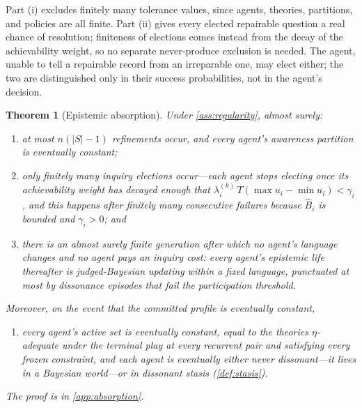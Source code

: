 \documentclass[11pt]{article}
\newtheorem{theorem}[assumption]{Theorem}
\theoremstyle{definition}
\begin{document}
Part (i) excludes finitely many tolerance values, since agents, theories,
partitions, and policies are all finite.  Part (ii) gives every elected
repairable question a real chance of resolution; finiteness of elections comes
instead from the decay of the achievability weight, so no separate
never-produce exclusion is needed.  The agent, unable to tell a repairable
record from an irreparable one, may elect either; the two are distinguished
only in their success probabilities, not in the agent's decision.

\begin{theorem}[Epistemic absorption]
\label{thm:absorption}
Under \cref{ass:regularity}, almost surely:
\begin{enumerate}[label=(\alph*)]
  \item at most $n(|S|-1)$ refinements occur, and every agent's awareness
  partition is eventually constant;
  \item only finitely many inquiry elections occur---each agent stops
  electing once its achievability weight has decayed enough that
  $\lambda_i^{(k)}\,T(\max u_i-\min u_i)<\gamma_i$, and this happens after
  finitely many consecutive failures because $\widehat B_i$ is bounded and
  $\gamma_i>0$; and
  \item there is an almost surely finite generation after which no agent's
  language changes and no agent pays an inquiry cost: every agent's epistemic
  life thereafter is judged-Bayesian updating within a fixed language,
  punctuated at most by dissonance episodes that fail the participation
  threshold.
\end{enumerate}
Moreover, on the event that the committed profile is eventually constant,
\begin{enumerate}[label=(\alph*),start=4]
  \item every agent's active set is eventually constant, equal to the theories
  $\eta$-adequate under the terminal play at every recurrent pair and
  satisfying every frozen constraint, and each agent is eventually either
  never dissonant---it lives in a Bayesian world---or in dissonant stasis
  (\cref{def:stasis}).
\end{enumerate}
The proof is in \cref{app:absorption}.
\end{theorem}
\end{document}
